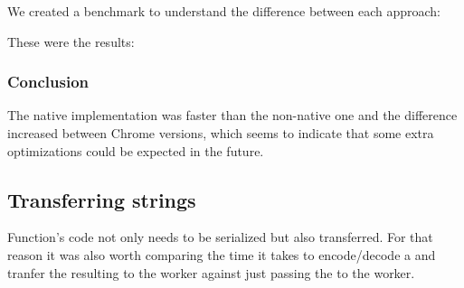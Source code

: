 We created a benchmark to understand the difference between each approach:

These were the results:

\subsubsection{Conclusion}
The native implementation was faster than the non-native one and the difference increased between Chrome versions, which seems to indicate that some extra optimizations could be expected in the future.

\subsection{Transferring strings}
Function's code not only needs to be serialized but also transferred. For that reason it was also worth comparing the time it takes to encode/decode a \tstring{} and tranfer the resulting \tabuffer{} to the worker against just passing the \tstring{} to the worker.

\pagebreak